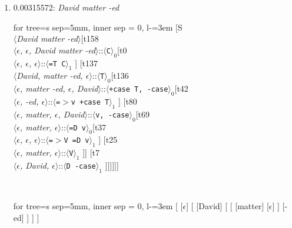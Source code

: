 \documentclass[11pt]{article}
\begin{document}
\begin{enumerate}
	\item  0.00315572: \textit{David matter -ed} \\[0.5em]
	\begin{adjustbox}{max width = \textwidth}
	\begin{forest}
	for tree={s sep=5mm, inner sep = 0, l-=3em}
	[S\\$\langle$\textit{David matter -ed}$\rangle$[t158\\$\langle$\textit{$\epsilon${,} $\epsilon${,} David matter -ed}$\rangle$::$\langle$\texttt{C}$\rangle_0$[t0\\$\langle$\textit{$\epsilon${,} $\epsilon${,} $\epsilon$}$\rangle$::$\langle$\texttt{{=}T C}$\rangle_1$ ] [t137\\$\langle$\textit{David{,} matter -ed{,} $\epsilon$}$\rangle$::$\langle$\texttt{T}$\rangle_0$[t136\\$\langle$\textit{$\epsilon${,} matter -ed{,} $\epsilon${,} David}$\rangle$::$\langle$\texttt{+case T{,} -case}$\rangle_0$[t42\\$\langle$\textit{$\epsilon${,} -ed{,} $\epsilon$}$\rangle$::$\langle$\texttt{{=}$>$v +case T}$\rangle_1$ ] [t80\\$\langle$\textit{$\epsilon${,} matter{,} $\epsilon${,} David}$\rangle$::$\langle$\texttt{v{,} -case}$\rangle_0$[t69\\$\langle$\textit{$\epsilon${,} matter{,} $\epsilon$}$\rangle$::$\langle$\texttt{{=}D v}$\rangle_0$[t37\\$\langle$\textit{$\epsilon${,} $\epsilon${,} $\epsilon$}$\rangle$::$\langle$\texttt{{=}$>$V {=}D v}$\rangle_1$ ] [t25\\$\langle$\textit{$\epsilon${,} matter{,} $\epsilon$}$\rangle$::$\langle$\texttt{V}$\rangle_1$ ]] [t7\\$\langle$\textit{$\epsilon${,} David{,} $\epsilon$}$\rangle$::$\langle$\texttt{D -case}$\rangle_1$ ]]]]]]
	\end{forest}
	\end{adjustbox}
	\\
	\begin{adjustbox}{max width = \textwidth}
	\begin{forest}
	for tree={s sep=5mm, inner sep = 0, l-=3em}
	[ [$\epsilon$] [ [David] [ [ [matter] [$\epsilon$] ] [-ed] ] ] ]
	\end{forest}
	\end{adjustbox}
	\newpage


\end{enumerate}
\end{document}
